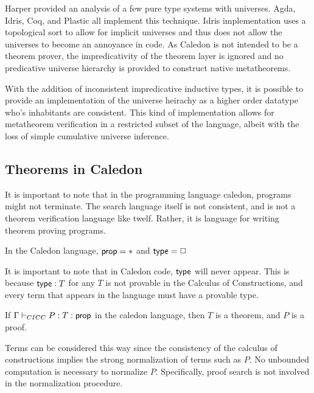 Harper \citep{harper1991type} provided an analysis of a few pure type systems with universes.
Agda, Idris, Coq,
and Plastic \citep{callaghan2001implementation} all implement this technique.
Idris implementation uses a topological sort to allow for implicit universes
and thus does not allow the universes to become an annoyance in code. 
As Caledon is not intended to be a theorem prover, the impredicativity of the theorem layer is ignored and no 
predicative universe hierarchy is provided to construct native metatheorems.

With the addition of inconsistent impredicative inductive types, it is possible to provide an implementation 
of the universe heirachy as a higher order datatype who's inhabitants are consistent.  This kind of implementation 
allows for metatheorem verification in a restricted subset of the language, albeit with the loss of 
simple cumulative universe inference.



\subsection{Theorems in Caledon}

It is important to note that in the programming language caledon, programs might not terminate.  
The search language itself is not consistent, and is not a theorem verification language like twelf.  
Rather, it is language for writing theorem proving programs.  

\begin{definition}
In the Caledon language, $\mathsf{prop} = *$ and $\mathsf{type} = \Box$
\end{definition}

It is important to note that in Caledon code, $\mathsf{type}$ will never appear.  This is because $\mathsf{type} : T$ for any $T$
is not provable in the Calculus of Constructions, and every term that appears in the language must have a provable type.

\begin{definition}
If $\Gamma \vdash_{CICC} P : T : \mathsf{prop}$ in the caledon language, then $T$ is a theorem, and $P$ is a proof.
\end{definition}

Terms can be considered this way since the consistency of the calculus of constructions implies the strong normalization
of terms such as $P$.  No unbounded computation is necessary to normalize $P$.  
Specifically, proof search is not involved in the normalization procedure.

